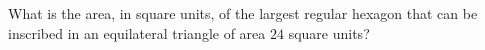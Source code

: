 What is the area, in square units, of the largest regular hexagon that can be inscribed in an equilateral triangle of area $24$ square units?
